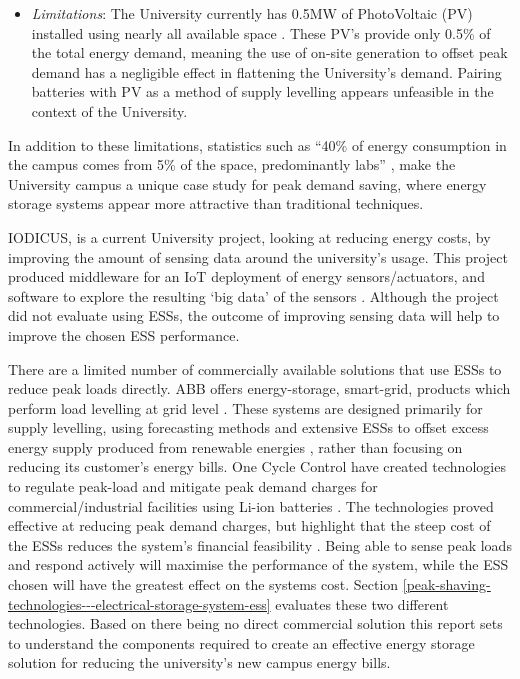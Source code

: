 \begin{itemize}
  \begin{itemize}
  \tightlist
  \item
    \emph{Limitations}: The University currently has 0.5MW of
    PhotoVoltaic (PV) installed using nearly all available space
    \cite{Jbrentmeet}. These PV's provide only 0.5\% of the total energy
    demand, meaning the use of on-site generation to offset peak demand
    has a negligible effect in flattening the University's demand.
    Pairing batteries with PV as a method of supply levelling appears
    unfeasible in the context of the University.
  \end{itemize}
\end{itemize}

In addition to these limitations, statistics such as ``40\% of energy
consumption in the campus comes from 5\% of the space, predominantly
labs'' \cite{brentemail}, make the University campus a unique case study
for peak demand saving, where energy storage systems appear more
attractive than traditional techniques.

IODICUS, is a current University project, looking at reducing energy
costs, by improving the amount of sensing data around the university's
usage. This project produced middleware for an IoT deployment of energy
sensors/actuators, and software to explore the resulting `big data' of
the sensors \cite{priestemail}. Although the project did not evaluate
using ESSs, the outcome of improving sensing data will help to improve
the chosen ESS performance.

There are a limited number of commercially available solutions that use
ESSs to reduce peak loads directly. ABB offers energy-storage,
smart-grid, products which perform load levelling at grid level
\cite{abbpeakshave}. These systems are designed primarily for supply
levelling, using forecasting methods and extensive ESSs to offset excess
energy supply produced from renewable energies \cite{5559470}, rather
than focusing on reducing its customer's energy bills. One Cycle Control
have created technologies to regulate peak-load and mitigate peak demand
charges for commercial/industrial facilities using Li-ion batteries
\cite{peakload38:online}. The technologies proved effective at reducing
peak demand charges, but highlight that the steep cost of the ESSs
reduces the system's financial feasibility \cite{Demonstr51:online}.
Being able to sense peak loads and respond actively will maximise the
performance of the system, while the ESS chosen will have the greatest
effect on the systems cost. Section
\ref{peak-shaving-technologies---electrical-storage-system-ess}
evaluates these two different technologies. Based on there being no
direct commercial solution this report sets to understand the components
required to create an effective energy storage solution for reducing the
university's new campus energy bills.

